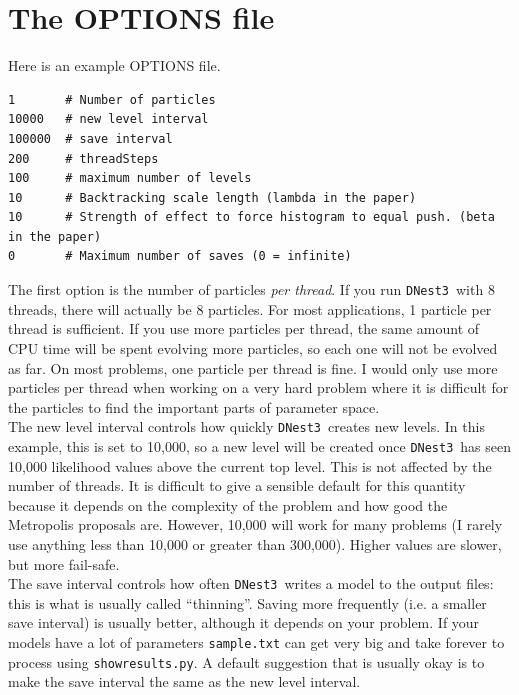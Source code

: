 \documentclass[a4paper, 11pt]{article}
\newcommand{\dnest}{{\tt DNest3}}
\begin{document}
\section{The OPTIONS file}\label{sec:options}
Here is an example OPTIONS file.
\begin{framed}
\begin{verbatim}
1       # Number of particles
10000   # new level interval
100000  # save interval
200     # threadSteps
100     # maximum number of levels
10      # Backtracking scale length (lambda in the paper)
10      # Strength of effect to force histogram to equal push. (beta in the paper)
0       # Maximum number of saves (0 = infinite)
\end{verbatim}
\end{framed}

The first option is the number of particles {\it per thread}. If you run
\dnest~with 8 threads, there will actually be 8 particles. For most
applications, 1 particle per thread is sufficient. If you use more particles
per thread, the same amount of CPU time will be spent evolving more particles,
so each one will not be evolved as far. On most problems, one particle per
thread is fine. I would only use more particles per thread when working on
a very hard problem where it is difficult for the particles to find the
important parts of parameter space.\\

The new level interval controls how quickly \dnest~creates new levels. In this
example, this is set to 10,000, so a new level will be created once \dnest~has
seen 10,000 likelihood values above the current top level. This is not affected by
the number of threads. It is difficult to give a sensible default for this
quantity because it depends on the complexity of the problem and how good
the Metropolis proposals are. However, 10,000
will work for many problems (I rarely use anything less than 10,000 or greater
than 300,000). Higher values are slower, but more fail-safe.\\

The save interval controls how often \dnest~writes a model to the output
files: this is what is usually called ``thinning''. Saving more frequently
(i.e. a smaller save interval) is usually better, although it depends on your
problem. If your models have a lot of parameters {\tt sample.txt} can get
very big and take forever to process using {\tt showresults.py}. A default
suggestion that is usually okay is to make the save interval the same as the
new level interval.\\
\end{document}
